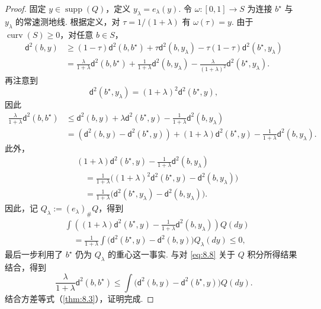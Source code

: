 \begin{proof}
固定 $y\in\operatorname{supp}(Q)$，定义 $y_\lambda=e_\lambda(y)$. 令 $\omega:[0,1]\to S$ 为连接 $b^\star$ 与 $y_\lambda$ 的常速测地线. 根据定义，对 $\tau=1/(1+\lambda)$ 有 $\omega(\tau)=y$. 由于 $\operatorname{curv}(S)\ge0$，对任意 $b\in S$，
$$\begin{aligned}
\mathsf d^2(b,y)&\ge(1-\tau)\mathsf d^2(b,b^\star)+\tau\mathsf d^2(b,y_\lambda)
-\tau(1-\tau)\mathsf d^2(b^\star,y_\lambda)\\
&=\frac\lambda{1+\lambda}\mathsf d^2(b,b^\star)
+\frac1{1+\lambda}\mathsf d^2(b,y_\lambda)
-\frac\lambda{(1+\lambda)^2}\mathsf d^2(b^\star,y_\lambda).
\end{aligned}$$
再注意到
$$\mathsf d^2(b^\star,y_\lambda)=(1+\lambda)^2\mathsf d^2(b^\star,y),$$
因此
\begin{equation}\label{eq:8.8}
\begin{aligned}
\frac\lambda{1+\lambda}\mathsf d^2(b,b^\star)
&\le\mathsf d^2(b,y)+\lambda\mathsf d^2(b^\star,y)-\frac1{1+\lambda}\mathsf d^2(b,y_\lambda)\\
&=(\mathsf d^2(b,y)-\mathsf d^2(b^\star,y))
+(1+\lambda)\mathsf d^2(b^\star,y)-\frac1{1+\lambda}\mathsf d^2(b,y_\lambda).
\end{aligned}
\end{equation}
此外，
$$\begin{aligned}
&(1+\lambda)\mathsf d^2(b^\star,y)-\frac1{1+\lambda}\mathsf d^2(b,y_\lambda)\\
&\quad=\frac1{1+\lambda}\bigl((1+\lambda)^2\mathsf d^2(b^\star,y)-\mathsf d^2(b,y_\lambda)\bigr)\\
&\quad=\frac1{1+\lambda}\bigl(\mathsf d^2(b^\star,y_\lambda)-\mathsf d^2(b,y_\lambda)\bigr).
\end{aligned}$$
因此，记 $Q_\lambda:=(e_\lambda)_\#Q$，得到
$$\begin{aligned}
&\int\left((1+\lambda)\mathsf d^2(b^\star,y)-\frac1{1+\lambda}\mathsf d^2(b,y_\lambda)\right)Q(dy)\\
&\quad=\frac1{1+\lambda}\int\bigl(\mathsf d^2(b^\star,y)-\mathsf d^2(b,y)\bigr)Q_\lambda(dy)\le0,
\end{aligned}$$
最后一步利用了 $b^\star$ 仍为 $Q_\lambda$ 的重心这一事实. 与对 \eqref{eq:8.8} 关于 $Q$ 积分所得结果结合，得到
\begin{equation}\label{eq:8.9}
\frac\lambda{1+\lambda}\mathsf d^2(b,b^\star)
\le\int\bigl(\mathsf d^2(b,y)-\mathsf d^2(b^\star,y)\bigr)Q(dy).
\end{equation}
结合方差等式（\autoref{thm:8.3}），证明完成.
\end{proof}

